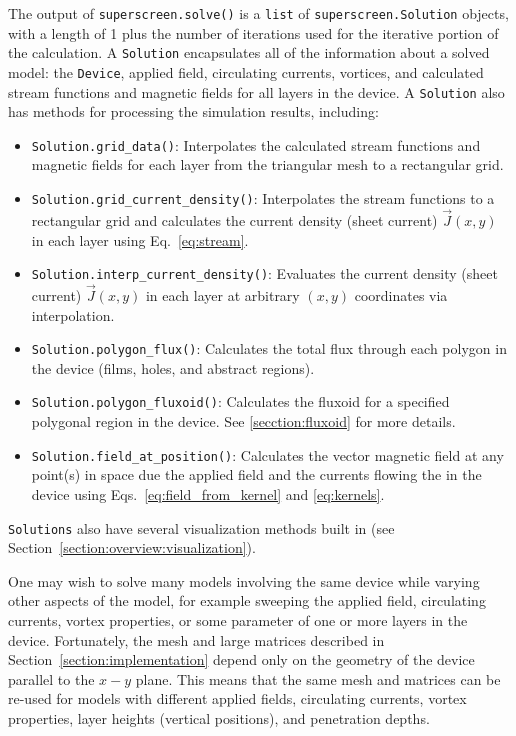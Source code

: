 \documentclass[final,3p,times]{elsarticle}
\newcommand{\inline}[1]{\texttt{#1}\xspace}
\begin{document}
The output of \inline{superscreen.solve()} is a \inline{list} of \inline{superscreen.Solution} objects, with a length of 1 plus the number of iterations used for the iterative portion of the calculation. A \inline{Solution} encapsulates all of the information about a solved model: the \inline{Device}, applied field, circulating currents, vortices, and calculated stream functions and magnetic fields for all layers in the device. A \inline{Solution} also has methods for processing the simulation results, including:
\begin{itemize}
    \item{
    \inline{Solution.grid_data()}: Interpolates the calculated stream functions and magnetic fields for each layer from the triangular mesh to a rectangular grid.
    }
    \item{
    \inline{Solution.grid_current_density()}: Interpolates the stream functions to a rectangular grid and calculates the current density (sheet current) $\vec{J}(x, y)$ in each layer using Eq.~\ref{eq:stream}.
    }
    \item{
    \inline{Solution.interp_current_density()}: Evaluates the current density (sheet current) $\vec{J}(x, y)$ in each layer at arbitrary $(x, y)$ coordinates via interpolation.
    }
    \item{
    \inline{Solution.polygon_flux()}: Calculates the total flux through each polygon in the device (films, holes, and abstract regions).
    }
    \item{
    \inline{Solution.polygon_fluxoid()}: Calculates the fluxoid for a specified polygonal region in the device. See \ref{secction:fluxoid} for more details.
    }
    \item{
    \inline{Solution.field_at_position()}: Calculates the vector magnetic field at any point(s) in space due the applied field and the currents flowing the in the device using Eqs.~\ref{eq:field_from_kernel} and \ref{eq:kernels}.
    }
\end{itemize}
\inline{Solutions} also have several visualization methods built in (see Section~\ref{section:overview:visualization}).

One may wish to solve many models involving the same device while varying other aspects of the model, for example sweeping the applied field, circulating currents, vortex properties, or some parameter of one or more layers in the device. Fortunately, the mesh and large matrices described in Section~\ref{section:implementation} depend only on the geometry of the device parallel to the $x-y$ plane. This means that the same mesh and matrices can be re-used for models with different applied fields, circulating currents, vortex properties, layer heights (vertical positions), and penetration depths.
\end{document}
